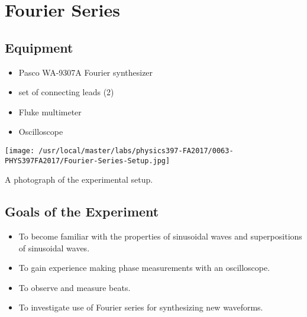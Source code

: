 

%
%


\setcounter{chapter}{8}
\setcounter{equation}{0}
\setcounter{table}{0}
\setcounter{figure}{0}
\chapter{Fourier Series}

\section{Equipment}

\begin{minipage}[t]{0.7\textwidth}
\begin{itemize}[noitemsep]
\item Pasco WA-9307A Fourier synthesizer
\item set of connecting leads (2)
\end{itemize}
\end{minipage}
\begin{minipage}[t]{0.3\textwidth}
\begin{itemize}[noitemsep]
\item Fluke multimeter
\item Oscilloscope
\end{itemize}
\end{minipage}


\begin{marginfigure}[+1in]
\texttt{[image: /usr/local/master/labs/physics397-FA2017/0063-PHYS397FA2017/Fourier-Series-Setup.jpg]}
\caption{A photograph of the experimental setup.}
\label{fig:FSsetup}
\end{marginfigure}

\section{Goals of the Experiment}
\begin{itemize}
\item To become familiar with the properties of sinusoidal waves and superpositions of sinusoidal waves.
\item  To gain experience making phase measurements with an oscilloscope.
\item To observe and measure beats.
\item To investigate use of Fourier series for synthesizing new waveforms.
\end{itemize}

